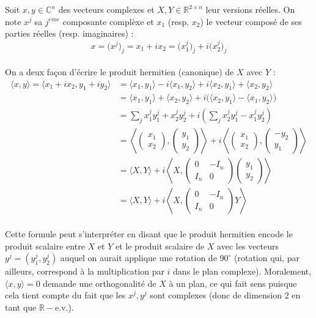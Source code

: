 \documentclass[hidelinks, french, oneside]{article}
\newcommand{\R}{\mathbb{R}}
\newcommand{\C}{\mathbb{C}}
\theoremstyle{enonce}
\theoremstyle{special}
\theoremstyle{rqlike}
\theoremstyle{exo}
\theoremstyle{demo}
\begin{document}
Soit $x,y\in\C^n$ des vecteurs complexes et $X,Y\in\R^{2\times n}$ leur versions réelles. On note $x^j$ sa $j^{eme}$ composante complèxe et $x_1$ (resp. $x_2$) le vecteur composé de ses parties réelles (resp. imaginaires) :
\[x = \big(x^j\big)_j =  x_1 + ix_2 =  \big(x^j_1\big)_j +i \big(x^j_2\big)_j\]
\\
On a deux façon d'écrire le produit hermitien (canonique) de $X$ avec $Y$ :
\begin{align*}
\langle x,y \rangle = \langle x_1 + ix_2, y_1 + iy_2\rangle &= \langle x_1, y_1\rangle - i \langle x_1,y_2\rangle +i\langle x_2, y_1\rangle + \langle x_2, y_2\rangle  \\
	&= \langle x_1, y_1\rangle + \langle x_2, y_2\rangle 
		+ i\big(\langle x_2, y_1\rangle - \langle x_1,y_2\rangle\big) \\
	&= \sum_j x^j_1 y^j_1+ x^j_2 y^j_2
		+ i\left(\sum_j x^j_2 y^j_1 -  x^j_1y^j_2\right) \\
	&= \left\langle \begin{pmatrix} x_1 \\ x_2 \end{pmatrix},\begin{pmatrix} y_1 \\ y_2 \end{pmatrix}\right\rangle
		+ i\left\langle \begin{pmatrix} x_1 \\ x_2 \end{pmatrix},\begin{pmatrix} -y_2 \\ y_1 \end{pmatrix}\right\rangle \\
		&= \Big\langle X,Y\Big\rangle 
		+ i\left\langle X,\begin{pmatrix} 0 & -I_n \\ I_n & 0 \end{pmatrix}\begin{pmatrix} y_1 \\ y_2 \end{pmatrix}\right\rangle\\
	&= \Big\langle X,Y\Big\rangle 
		+ i\left\langle X,\begin{pmatrix} 0 & -I_n \\ I_n & 0 \end{pmatrix}Y\right\rangle
\end{align*}
\\
Cette formule peut s’interpréter en disant que le produit hermitien encode le produit scalaire entre $X$ et $Y$ et le produit scalaire de $X$ avec les vecteurs $y^j=(y^j_1, y^j_2)$  auquel on aurait applique une rotation de $90^\circ$ (rotation qui, par ailleurs, correspond à la multiplication par $i$ dans le plan complexe). Moralement, $\langle x,y \rangle =0$ demande une orthogonalité de $X$ à un plan, ce qui fait sens puisque cela tient compte du fait que les $x^j, y^j$ sont complexes (donc de dimension 2 en tant que $\R-$e.v.).
\end{document}
